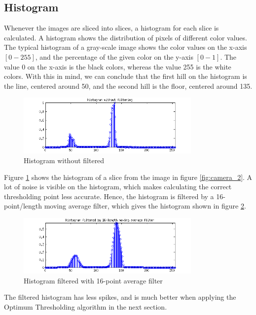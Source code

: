%
%
%
%
\subsection{Histogram}

Whenever the images are sliced into slices, a histogram for each slice is calculated. A histogram shows the distribution of pixels of different color values. The typical histogram of a gray-scale image shows the color values on the x-axis $[0-255]$, and the percentage of the given color on the y-axis $[0-1]$. The value 0 on the x-axis is the black colors, whereas the value 255 is the white colors. With this in mind, we can conclude that the first hill on the histogram is the line, centered around 50, and the second hill is the floor, centered around 135.

\begin{figure}[!h]
	\centering
	\includegraphics[width=0.8\textwidth]{resources/hist-no-filter}
	\caption{Histogram without filtered}
	\label{fig:camera_3}
\end{figure}

Figure \ref{fig:camera_3} shows the histogram of a slice from the image in figure \ref{fig:camera_2}. A lot of noise is visible on the histogram, which makes calculating the correct thresholding point less accurate. Hence, the histogram is filtered by a 16-point/length moving average filter, which gives the histogram shown in figure \ref{fig:camera_4}.

\begin{figure}[!h]
	\centering
	\includegraphics[width=0.8\textwidth]{resources/hist-filter}
	\caption{Histogram filtered with 16-point average filter}
	\label{fig:camera_4}
\end{figure}

The filtered histogram has less spikes, and is much better when applying the Optimum Thresholding algorithm in the next section.


